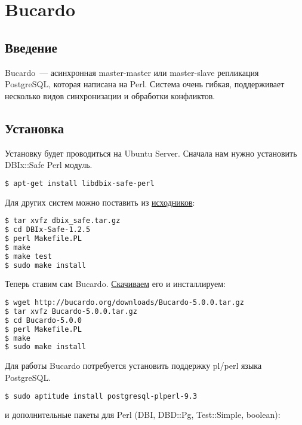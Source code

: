 \section{Bucardo}
\subsection{Введение}
Bucardo~--- асинхронная master-master или master-slave репликация PostgreSQL, которая написана на Perl. Система очень гибкая, поддерживает несколько видов синхронизации и обработки конфликтов.

\subsection{Установка}

Установку будет проводиться на Ubuntu Server. Сначала нам нужно установить DBIx::Safe Perl модуль.

\begin{lstlisting}[language=Bash,label=lst:bucardo1,caption=Установка]
$ apt-get install libdbix-safe-perl
\end{lstlisting}

Для других систем можно поставить из \href{http://search.cpan.org/CPAN/authors/id/T/TU/TURNSTEP/}{исходников}:

\begin{lstlisting}[language=Bash,label=lst:bucardo2,caption=Установка]
$ tar xvfz dbix_safe.tar.gz
$ cd DBIx-Safe-1.2.5
$ perl Makefile.PL
$ make
$ make test
$ sudo make install
\end{lstlisting}

Теперь ставим сам Bucardo. \href{http://bucardo.org/wiki/Bucardo#Obtaining_Bucardo}{Скачиваем} его и инсталлируем:

\begin{lstlisting}[language=Bash,label=lst:bucardo3,caption=Установка]
$ wget http://bucardo.org/downloads/Bucardo-5.0.0.tar.gz
$ tar xvfz Bucardo-5.0.0.tar.gz
$ cd Bucardo-5.0.0
$ perl Makefile.PL
$ make
$ sudo make install
\end{lstlisting}

Для работы Bucardo потребуется установить поддержку pl/perl языка PostgreSQL.

\begin{lstlisting}[language=Bash,label=lst:bucardo4,caption=Установка]
$ sudo aptitude install postgresql-plperl-9.3
\end{lstlisting}

и дополнительные пакеты для Perl (DBI, DBD::Pg, Test::Simple, boolean):

